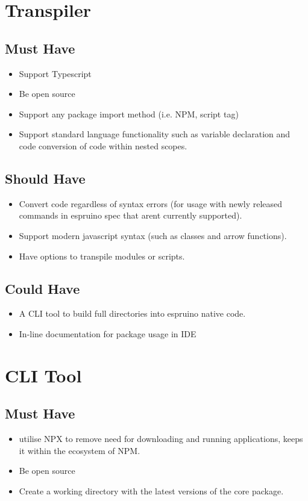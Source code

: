 \documentclass{l4proj}
\begin{document}
\begin{appendices}
\section{Transpiler}
\subsection{Must Have}
\begin{itemize}
    \item Support Typescript
    \item Be open source
    \item Support any package import method (i.e. NPM, script tag)
    \item Support standard language functionality such as variable declaration and code conversion of code within nested scopes.

\end{itemize}
\subsection{Should Have}
\begin{itemize}
    \item Convert code regardless of syntax errors (for usage with newly released commands in espruino spec that arent currently supported).
    \item Support modern javascript syntax (such as classes and arrow functions).
    \item Have options to transpile modules or scripts.

\end{itemize}
\subsection{Could Have}
\begin{itemize}
    \item A CLI tool to build full directories into espruino native code.
    \item In-line documentation for package usage in IDE

\end{itemize}


\section{CLI Tool}
\subsection{Must Have}
\begin{itemize}
    \item utilise NPX to remove need for downloading and running applications, keeps it within the ecosystem of NPM.
    \item Be open source
    \item Create a working directory with the latest versions of the core package.


\end{itemize}
\end{appendices}
\end{document}
